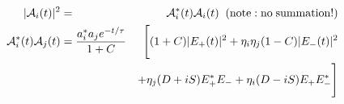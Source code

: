 \documentclass[a4paper,9pt,twosided]{article}
\begin{document}

\begin{eqnarray}
   |{\cal A}_i(t)|^2  &=& {\cal A}_i^*(t){\cal A}_i(t) \;\; (\mathrm{note: no\; summation!}) \\
  {\cal A}_i^*(t) {\cal A}_j(t) &= \frac{ a_i^* a_j e^{-t/\tau}} {1+C}&\Biggl[ (1+C) |E_+(t)|^2  +\eta_i\eta_j (1-C)|E_-(t)|^2 \nonumber\\
                                                                          && + \eta_j(D+iS)E_+^*E_-+\eta_i(D-iS)E_+E_-^*   \Biggr] \\

\end{eqnarray}
\end{document}
